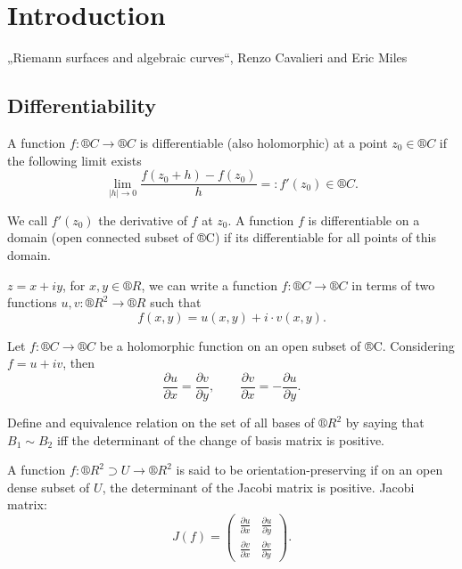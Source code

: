 \documentclass[12pt]{article}					%
\begin{document}

\section{Introduction}
\begin{poznamka}[Literature]
	„Riemann surfaces and algebraic curves“, Renzo Cavalieri and Eric Miles
\end{poznamka}

\subsection{Differentiability}
\begin{definice}[Differentiable]
	A function $f: ®C \rightarrow ®C$ is differentiable (also holomorphic) at a point $z_0 \in ®C$ if the following limit exists
	$$ \lim_{|h| \rightarrow 0} \frac{f(z_0 + h) - f(z_0)}{h} =: f'(z_0) \in ®C. $$

	We call $f'(z_0)$ the derivative of $f$ at $z_0$. A function $f$ is differentiable on a domain (open connected subset of ®C) if its differentiable for all points of this domain.
\end{definice}

\begin{poznamka}
	$z = x + iy$, for $x, y \in ®R$, we can write a function $f: ®C \rightarrow ®C$ in terms of two functions $u, v: ®R^2 \rightarrow ®R$ such that
	$$ f(x, y) = u(x, y) + i·v(x, y). $$
\end{poznamka}

\begin{veta}
	Let $f: ®C \rightarrow ®C$ be a holomorphic function on an open subset of ®C. Considering $f = u + iv$, then
	$$ \frac{\partial u}{\partial x} = \frac{\partial v}{\partial y}, \qquad \frac{\partial v}{\partial x} = -\frac{\partial u}{\partial y}. $$
\end{veta}

\begin{definice}
	Define and equivalence relation on the set of all bases of $®R^2$ by saying that $B_1 \sim B_2$ iff the determinant of the change of basis matrix is positive.

	A function $f: ®R^2 \supset U \rightarrow ®R^2$ is said to be orientation-preserving if on an open dense subset of $U$, the determinant of the Jacobi matrix is positive. Jacobi matrix:
	$$ J(f) = \begin{pmatrix} \frac{\partial u}{\partial x} & \frac{\partial u}{\partial y}\\ \frac{\partial v}{\partial x} & \frac{\partial v}{\partial y} \end{pmatrix}. $$
\end{definice}
\end{document}
